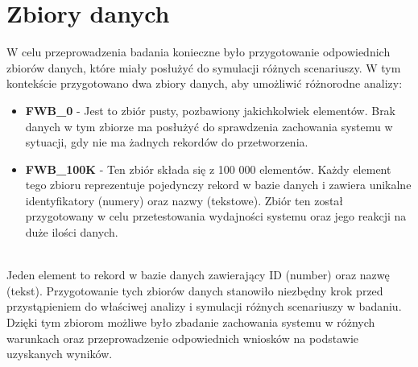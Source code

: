 \section{Zbiory danych}

W celu przeprowadzenia badania konieczne było przygotowanie odpowiednich zbiorów danych, które miały posłużyć do symulacji różnych scenariuszy.
W tym kontekście przygotowano dwa zbiory danych, aby umożliwić różnorodne analizy:

\begin{itemize}
  \item \textbf{FWB\_0} - Jest to zbiór pusty, pozbawiony jakichkolwiek elementów. Brak danych w tym zbiorze ma posłużyć do sprawdzenia zachowania systemu w sytuacji, gdy nie ma żadnych rekordów do przetworzenia.
  \item \textbf{FWB\_100K} - Ten zbiór składa się z 100 000 elementów. Każdy element tego zbioru reprezentuje pojedynczy rekord w bazie danych i zawiera unikalne identyfikatory (numery) oraz nazwy (tekstowe). Zbiór ten został przygotowany w celu przetestowania wydajności systemu oraz jego reakcji na duże ilości danych.
\end{itemize}
\phantom
\\
Jeden element to rekord w bazie danych zawierający ID (number) oraz nazwę (tekst).
Przygotowanie tych zbiorów danych stanowiło niezbędny krok przed przystąpieniem do właściwej analizy i symulacji różnych scenariuszy w badaniu. 
Dzięki tym zbiorom możliwe było zbadanie zachowania systemu w różnych warunkach oraz przeprowadzenie odpowiednich wniosków na podstawie uzyskanych wyników.